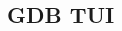 \documentclass[class=book, crop=false]{standalone}
\begin{document}
\begin{CJK}{UTF8}{gbsn}

\chapter{GDB TUI}













\cleardoublepage

\end{CJK}
\end{document}
